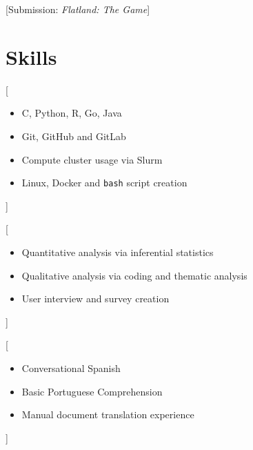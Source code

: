 \documentclass[11pt]{tianyicv}
\begin{document}

[\normalfont Submission: \textit{Flatland: The Game}]


\section{Skills}

[
    \begin{itemize}
        \item C, Python, R, Go, Java
        \item Git, GitHub and GitLab
        \item Compute cluster usage via Slurm
        \item Linux, Docker and \texttt{bash} script creation
    \end{itemize}
]

[
    \begin{itemize}
        \item Quantitative analysis via inferential statistics
        \item Qualitative analysis via coding and thematic analysis
        \item User interview and survey creation
    \end{itemize}
]

[
    \begin{itemize}
        \item Conversational Spanish
        \item Basic Portuguese Comprehension
        \item Manual document translation experience
    \end{itemize}
]
\end{document}
